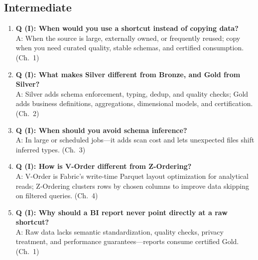 \subsection*{Intermediate}
\begin{enumerate}
    \item \textbf{Q (I): When would you use a shortcut instead of copying data?}\\
    A: When the source is large, externally owned, or frequently reused; copy when you need
    curated quality, stable schemas, and certified consumption. (Ch.~1)
    \item \textbf{Q (I): What makes Silver different from Bronze, and Gold from Silver?}\\
    A: Silver adds schema enforcement, typing, dedup, and quality checks; Gold adds business
    definitions, aggregations, dimensional models, and certification. (Ch.~2)
    \item \textbf{Q (I): When should you avoid schema inference?}\\
    A: In large or scheduled jobs---it adds scan cost and lets unexpected files shift inferred
    types. (Ch.~3)
    \item \textbf{Q (I): How is V-Order different from Z-Ordering?}\\
    A: V-Order is Fabric's write-time Parquet layout optimization for analytical reads;
    Z-Ordering clusters rows by chosen columns to improve data skipping on filtered queries.
    (Ch.~4)
    \item \textbf{Q (I): Why should a BI report never point directly at a raw shortcut?}\\
    A: Raw data lacks semantic standardization, quality checks, privacy treatment, and
    performance guarantees---reports consume certified Gold. (Ch.~1)
\end{enumerate}

